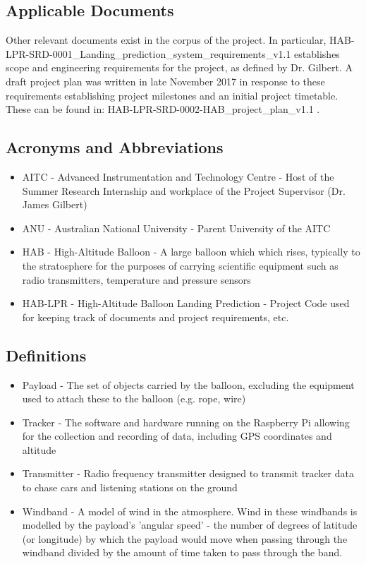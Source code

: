 \documentclass[11pt]{article}
\begin{document}
\subsection{Applicable Documents}
Other relevant documents exist in the corpus of the project. In particular, HAB-LPR-SRD-0001\_Landing\_prediction\_system\_requirements\_v1.1 establishes scope and engineering requirements for the project, as defined by Dr. Gilbert. A draft project plan was written in late November 2017 in response to these requirements establishing project milestones and an initial project timetable. These can be found in: HAB-LPR-SRD-0002-HAB\_project\_plan\_v1.1 .

\subsection{Acronyms and Abbreviations}

\begin{itemize}
\item AITC - Advanced Instrumentation and Technology Centre - Host of the Summer Research Internship and workplace of the Project Supervisor (Dr. James Gilbert)
\item ANU - Australian National University - Parent University of the AITC
\item HAB - High-Altitude Balloon - A large balloon which which rises, typically to the stratosphere for the purposes of carrying scientific equipment such as radio transmitters, temperature and pressure sensors
\item HAB-LPR - High-Altitude Balloon Landing Prediction - Project Code used for keeping track of documents and project requirements, etc.
\end{itemize}

\subsection{Definitions}

\begin{itemize}
\item Payload - The set of objects carried by the balloon, excluding the equipment used to attach these to the balloon (e.g. rope, wire)
\item Tracker - The software and hardware running on the Raspberry Pi allowing for the collection and recording of data, including GPS coordinates and altitude
\item Transmitter - Radio frequency transmitter designed to transmit tracker data to chase cars and listening stations on the ground
\item Windband - A model of wind in the atmosphere. Wind in these windbands is modelled by the payload's 'angular speed' - the number of degrees of latitude (or longitude) by which the payload would move when passing through the windband divided by the amount of time taken to pass through the band. 
\end{itemize}
\end{document}
